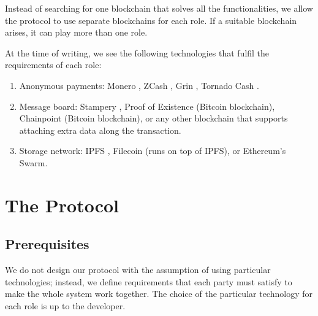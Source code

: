 \documentclass{ieeeaccess}
\begin{document}
Instead of searching for one blockchain that solves all the functionalities, we allow the protocol to use separate blockchains for each role. If a suitable blockchain arises, it can play more than one role.

At the time of writing, we see the following technologies that fulfil the requirements of each role:

\begin{enumerate}
\def\labelenumi{\arabic{enumi}.}

\item Anonymous payments: Monero \cite{van2013cryptonote}, ZCash
  \cite{sasson2014zerocash}, Grin \cite{fuchsbauer2019aggregate},
  Tornado Cash \cite{pertsev2019tornado}.
\item Message board: Stampery \cite{de2016stampery}, Proof of Existence
  \cite{proofofexistence} (Bitcoin blockchain), Chainpoint
  \cite{Chainpoi39} (Bitcoin blockchain), or any other blockchain that
  supports attaching extra data along the transaction.
\item Storage network: IPFS \cite{benet2014ipfs}, Filecoin
  \cite{benetfilecoin} (runs on top of IPFS), or Ethereum's
  Swarm\cite{swarmwhi49}.
\end{enumerate}

\section{The Protocol}\label{sec:protocol}

\subsection{Prerequisites}
We do not design our protocol with the assumption of using particular technologies; instead, we define requirements that each party must satisfy to make the whole system work together. The choice of the particular technology for each role is up to the developer.
\end{document}
